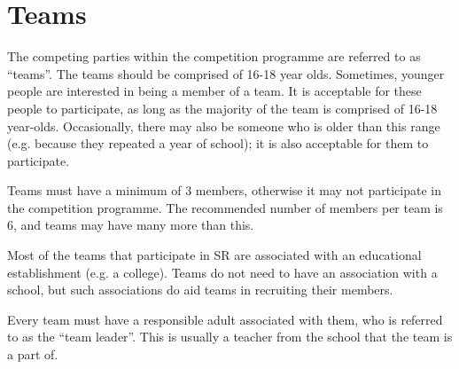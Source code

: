 \section{Teams}

The competing parties within the competition programme are referred to as ``teams''.  The teams should be comprised of 16-18 year olds.  Sometimes, younger people are interested in being a member of a team.  It is acceptable for these people to participate, as long as the majority of the team is comprised of 16-18 year-olds.  Occasionally, there may also be someone who is older than this range (e.g. because they repeated a year of school); it is also acceptable for them to participate.

Teams must have a minimum of 3 members, otherwise it may not participate in the competition programme.  The recommended number of members per team is 6, and teams may have many more than this.

Most of the teams that participate in SR are associated with an educational establishment (e.g. a college).  Teams do not need to have an association with a school, but such associations do aid teams in recruiting their members.

Every team must have a responsible adult associated with them, who is referred to as the ``team leader''.  This is usually a teacher from the school that the team is a part of.

